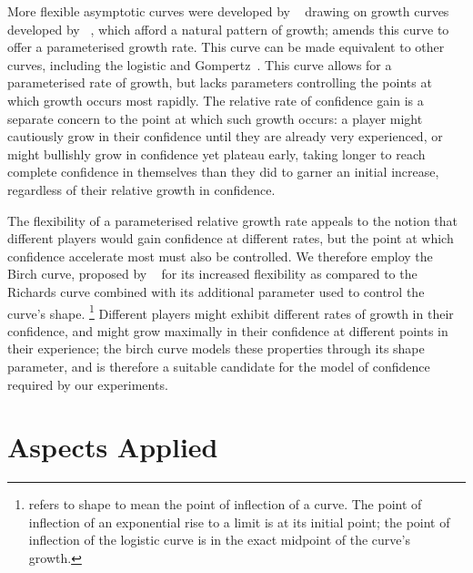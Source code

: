 More flexible asymptotic curves were developed by
\citeauthor{richards1959flexiblegrowth}~\cite{richards1959flexiblegrowth}
drawing on growth curves developed by
\citeauthor{von1938quantitative}~\cite{von1938quantitative}, which afford a
natural pattern of growth; \citeauthor{richards1959flexiblegrowth} amends this
curve to offer a parameterised growth rate. This curve can be made equivalent to
other curves, including the logistic and Gompertz~\cite{france1984mathematical}.
This curve allows for a parameterised rate of growth, but lacks parameters
controlling the points at which growth occurs most rapidly. The relative rate of
confidence gain is a separate concern to the point at which such growth occurs:
a player might cautiously grow in their confidence until they are already very
experienced, or might bullishly grow in confidence yet plateau early, taking
longer to reach complete confidence in themselves than they did to garner an
initial increase, regardless of their relative growth in confidence.

The flexibility of a parameterised relative growth rate appeals to the notion
that different players would gain confidence at different rates, but the point
at which confidence accelerate most must also be controlled. We therefore employ
the Birch curve, proposed by \citeauthor{birch1999new}~\cite{birch1999new} for
its increased flexibility as compared to the Richards curve combined with its
additional parameter used to control the curve's shape.
\footnote{\citeauthor{birch1999new} refers to shape to mean the point of
inflection of a curve. The point of inflection of an exponential rise to a limit
is at its initial point; the point of inflection of the logistic curve is in the
exact midpoint of the curve's growth.} Different players might exhibit different
rates of growth in their confidence, and might grow maximally in their
confidence at different points in their experience; the birch curve models these
properties through its shape parameter, and is therefore a suitable candidate
for the model of confidence required by our experiments.


\section{Aspects Applied}\label{sec:optimisation_with_aspects_aspectsdeveloped}





